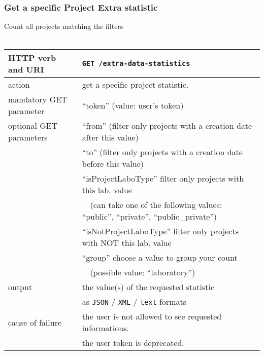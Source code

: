 \subsubsection{Get a specific Project Extra statistic}
\hspace*{\parindent}
Count all projects matching the filters
\\~\\
\begin{tabular}{ | l | l | }
	\hline
	HTTP verb and URI & \texttt{GET /extra-data-statistics} \\
	\hline
	action & get a specific project statistic. \\
	\hline
	mandatory GET parameter & ``token'' (value: user's token) \\
	\hline
	optional GET parameters & ``from'' (filter only projects with a creation date after this value) \\
	\space & ``to'' (filter only projects with a creation date before this value) \\
	\space & ``isProjectLaboType'' filter only projects with this lab. value \\
	\space & ~~(can take one of the following values: ``public'', ``private'', ``public\_private'') \\
	\space & ``isNotProjectLaboType'' filter only projects with NOT this lab. value \\
	\space & ``group'' choose a value to group your count \\
	\space & ~~(possible value: ``laboratory'') \\
	\hline
	output & the value(s) of the requested statistic \\
	\space & as \texttt{JSON} / \texttt{XML} / \texttt{text} formats \\
	\hline
	cause of failure & the user is not allowed to see requested informations. \\
	\space & the user token is deprecated. \\
	\hline
\end{tabular}
\newline

